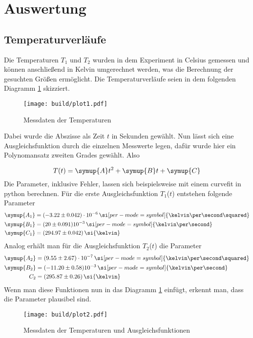 \section{Auswertung}
\subsection{Temperaturverläufe}
Die Temperaturen $T_{1}$ und $T_{2}$ wurden in dem Experiment in Celsius gemessen und können anschließend in Kelvin umgerechnet werden, was die Berechnung
der gesuchten Größen ermöglicht. Die Temperaturverläufe seien in dem folgenden Diagramm \ref{fig:plot1} skizziert.
\begin{figure}[h]
  \centering
  \texttt{[image: build/plot1.pdf]}
  \caption{Messdaten der Temperaturen}
  \label{fig:plot1}
\end{figure}
\begin{flushleft}
Dabei wurde die Abszisse als Zeit $t$ in Sekunden gewählt. Nun lässt sich eine Ausgleichsfunktion durch
die einzelnen Messwerte legen, dafür wurde hier ein Polynomansatz zweiten Grades gewählt. Also
\end{flushleft}
\begin{equation}
T(t) = \symup{A} t^{2} + \symup{B} t + \symup{C}
\end{equation}
Die Parameter, inklusive Fehler, lassen sich beispielsweise mit einem curvefit in python berechnen.
Für die erste Ausgleichsfunktion $T_{1}$($t$) entstehen folgende Parameter
\begin{align}
\symup{A_{1}} &= (-3.22 \pm 0.042)\cdot 10^{-6} \, \si[per-mode=symbol]{\kelvin\per\second\squared}\\
\symup{B_{1}} &= (20 \pm 0.091) 10^{-3} \,\si[per-mode=symbol]{\kelvin\per\second}\\
\symup{C_{1}} &= (294.97 \pm 0.042) \,\si{\kelvin}
\end{align}
Analog erhält man für die Ausgleichsfunktion $T_{2}$($t$) die Parameter
\begin{align}
\symup{A_{2}} &= (9.55 \pm 2.67)\cdot 10^{-7} \, \si[per-mode=symbol]{\kelvin\per\second\squared}\\
\symup{B_{2}} &= (-11.20 \pm 0.58) 10^{-3} \,\si[per-mode=symbol]{\kelvin\per\second}\\
C_{2} &= (295.87 \pm 0.26) \,\si{\kelvin}
\end{align}
Wenn man diese Funktionen nun in das Diagramm \ref{fig:plot1} einfügt, erkennt man,
dass die Parameter plausibel sind.
\begin{figure}[h]
  \centering
  \texttt{[image: build/plot2.pdf]}
  \caption{Messdaten der Temperaturen und Ausgleichsfunktionen}
  \label{fig:plot2}
\end{figure}
